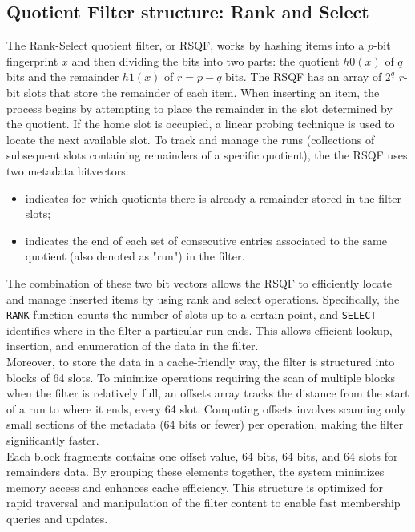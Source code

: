 \subsection{Quotient Filter structure: Rank and Select}
The Rank-Select quotient filter, or RSQF, works by hashing items into a $p$-bit fingerprint $x$ and then dividing the bits into two parts: the quotient $h0(x)$ of $q$ bits and the remainder $h1(x)$ of $r = p - q$ bits. The RSQF has an array of $2^q$ $r$-bit slots that store the remainder of each item. When inserting an item, the process begins by attempting to place the remainder in the slot determined by the quotient. If the home slot is occupied, a linear probing technique is used to locate the next available slot.
To track and manage the runs (collections of subsequent slots containing remainders of a specific quotient), the the RSQF uses two metadata bitvectors:
\begin{itemize}
	\item[\occs] indicates for which quotients there is already a remainder stored in the filter slots;
	\item[\rends] indicates the end of each set of consecutive entries associated to the same quotient (also denoted as "run") in the filter.
\end{itemize}
The combination of these two bit vectors allows the RSQF to efficiently locate and manage inserted items by using rank and select operations. Specifically, the \texttt{RANK} function counts the number of \occ slots up to a certain point, and  \texttt{SELECT} identifies where in the filter a particular run ends. This allows efficient lookup, insertion, and enumeration of the data in the filter.\\
Moreover, to store the data in a cache-friendly way, the filter is structured into blocks of 64 slots. To minimize operations requiring the scan of multiple blocks when the filter is relatively full, an offsets array tracks the distance from the start of a run to where it ends, every 64 slot. Computing offsets involves scanning only small sections of the metadata (64 bits or fewer) per operation, making the filter significantly faster.\\
Each block fragments contains one offset value, 64 \occs bits, 64 \rends bits, and 64 slots for remainders data. By grouping these elements together, the system minimizes memory access and enhances cache efficiency. This structure is optimized for rapid traversal and manipulation of the filter content to enable fast membership queries and updates.\\
